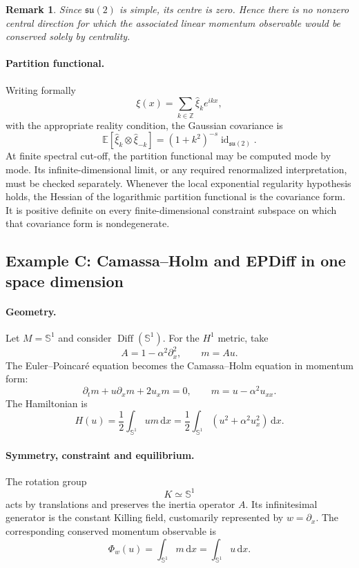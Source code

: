 \documentclass[11pt,reqno]{amsart}
\newtheorem{rem}[Theorem]{Remark}
\begin{document}
\begin{rem}
Since $\mathfrak{su}(2)$ is simple, its centre is zero. Hence there is
no nonzero central direction for which the associated linear momentum
observable would be conserved solely by centrality.
\end{rem}

\paragraph{\bfseries Partition functional.}
Writing formally
\[
\xi(x)
=
\sum_{k\in\mathbb Z}
\widehat\xi_k e^{ikx},
\]
with the appropriate reality condition, the Gaussian covariance is
\[
\mathbb E
\left[
\widehat\xi_k\otimes\widehat\xi_{-k}
\right]
=
(1+k^2)^{-s}\operatorname{id}_{\mathfrak{su}(2)}.
\]
At finite spectral cut-off, the partition functional may be computed
mode by mode. Its infinite-dimensional limit, or any required
renormalized interpretation, must be checked separately. Whenever the
local exponential regularity hypothesis holds, the Hessian of the
logarithmic partition functional is the covariance form. It is positive
definite on every finite-dimensional constraint subspace on which that
covariance form is nondegenerate.

\subsection{Example C: Camassa--Holm and EPDiff in one space dimension}

\paragraph{\bfseries Geometry.}
Let $M=\mathbb S^1$ and consider
$\operatorname{Diff}(\mathbb S^1)$. For the $H^1$ metric, take
\[
A=1-\alpha^2\partial_x^2,
\qquad
m=Au.
\]
The Euler--Poincaré equation becomes the Camassa--Holm equation in
momentum form:
\[
\partial_t m+u\partial_xm+2u_xm=0,
\qquad
m=u-\alpha^2u_{xx}.
\]
The Hamiltonian is
\[
H(u)
=
\frac12
\int_{\mathbb S^1}um\,\mathrm dx
=
\frac12
\int_{\mathbb S^1}
\left(
u^2+\alpha^2u_x^2
\right)
\,\mathrm dx.
\]

\paragraph{\bfseries Symmetry, constraint and equilibrium.}
The rotation group
\[
K\simeq\mathbb S^1
\]
acts by translations and preserves the inertia operator $A$. Its
infinitesimal generator is the constant Killing field, customarily
represented by $w=\partial_x$. The corresponding conserved momentum
observable is
\[
\Phi_w(u)
=
\int_{\mathbb S^1}m\,\mathrm dx
=
\int_{\mathbb S^1}u\,\mathrm dx.
\]
\end{document}

